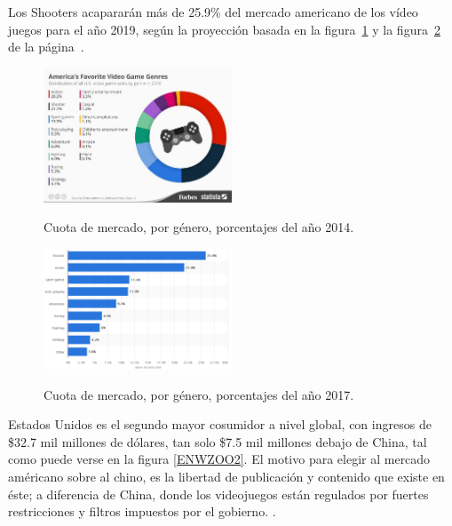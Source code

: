 \documentclass[]{article}
\begin{document}
Los Shooters acaparar\'an m\'as de 25.9\% del  mercado americano de los v\'ideo juegos para el a\~no 2019, seg\'un la proyecci\'on basada en la figura~\ref{FORB2}  y la figura~\ref{STAT2} de la p\'agina~\pageref{STAT2}.


\begin{figure}[H]
	
	\centering
	\includegraphics[width=0.5\textwidth]{Picture1}
	\caption{Cuota de mercado, por g\'enero, porcentajes del a\~no 2014.} 
	\label{FORB2}
	\cite{Forbes}
	
	
\end{figure}

\begin{figure}[H]
	
	\centering
	\includegraphics[width=0.5\textwidth]{statista-2}
	\caption{Cuota de mercado, por g\'enero, porcentajes del a\~no 2017.  } 
	\label{STAT2}
	\cite{Statista}
	
	
\end{figure}

Estados Unidos es el segundo mayor cosumidor a nivel global, con ingresos de \$32.7 mil millones de d\'olares, tan solo \$7.5 mil millones debajo de China, tal como puede verse en la figura \ref{ENWZOO2}.
El motivo para elegir al mercado am\'ericano sobre al chino, es la libertad de publicaci\'on y contenido que existe en \'este; a diferencia de China, donde los videojuegos est\'an regulados por fuertes restricciones y filtros impuestos por el gobierno. \cite{china1}.
\end{document}
